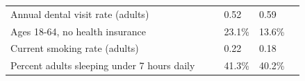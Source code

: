 \documentclass[9pt]{report}
\begin{document}
\begin{tabular}{p{.10in}p{.10in}p{.10in}p{3.7in}>{\hfill}p{.85in}>{\hfill}p{.85in}>{\hfill}p{.85in}>{\hfill}p{.85in}p{0.1in}}
\multicolumn{4}{l}{\parbox{3.6in}{\strut\raggedright{{Annual dental visit rate (adults)}}\strut}} &  &  & 0.52 & 0.59 & \multicolumn{1}{l}{}  \\ 
\multicolumn{4}{l}{\parbox{3.6in}{\strut\raggedright{{Ages 18-64, no health insurance}}\strut}} &  &  & 23.1\% & 13.6\% & \multicolumn{1}{l}{}  \\ 
\multicolumn{4}{l}{\parbox{3.6in}{\strut\raggedright{{Current smoking rate (adults)}}\strut}} &  &  & 0.22 & 0.18 & \multicolumn{1}{l}{}  \\ 
\multicolumn{4}{l}{\parbox{3.6in}{\strut\raggedright{{Percent adults sleeping under 7 hours daily}}\strut}} &  &  & 41.3\% & 40.2\% & \multicolumn{1}{l}{}  \\ 

\end{tabular}
\setlength{\tabcolsep}{6pt} %


\vspace{36pt}
\linespread{1.5}
\theendnotes
\end{document}
